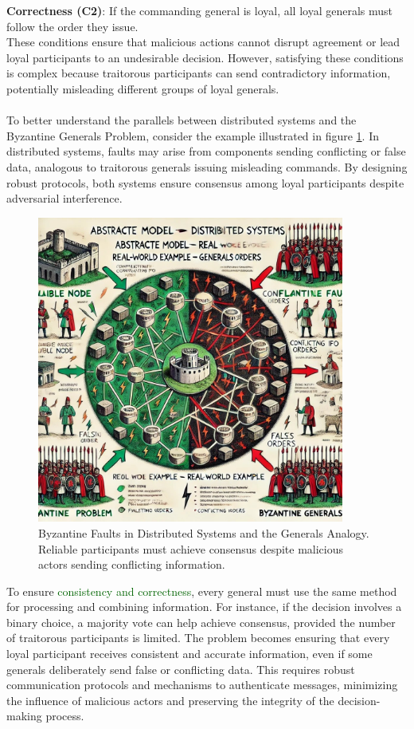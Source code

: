 \documentclass[12pt]{article}
\theoremstyle{remark}
\begin{document}
\textbf{Correctness (C2)}: If the commanding general is loyal, all loyal generals must follow the order they issue.\\
These conditions ensure that malicious actions cannot disrupt agreement or lead loyal participants to an undesirable decision. However, satisfying these conditions is complex because traitorous participants can send contradictory information, potentially misleading different groups of loyal generals.
\\
\\
To better understand the parallels between distributed systems and the Byzantine Generals Problem, consider the example illustrated in figure \ref{fig:byzantine_faults}. In distributed systems, faults may arise from components sending conflicting or false data, analogous to traitorous generals issuing misleading commands. By designing robust protocols, both systems ensure consensus among loyal participants despite adversarial interference.

\begin{figure}[H] \centering \includegraphics[width=0.9\textwidth]{images/Byz1.jpg}
\caption{Byzantine Faults in Distributed Systems and the Generals Analogy. Reliable participants must achieve consensus despite malicious actors sending conflicting information.} \label{fig:byzantine_faults} \end{figure}

To ensure \textcolor{darkgreen}{consistency and correctness}, every general must use the same method for processing and combining information. For instance, if the decision involves a binary choice, a majority vote can help achieve consensus, provided the number of traitorous participants is limited. The problem becomes ensuring that every loyal participant receives consistent and accurate information, even if some generals deliberately send false or conflicting data. This requires robust communication protocols and mechanisms to authenticate messages, minimizing the influence of malicious actors and preserving the integrity of the decision-making process.
\end{document}
